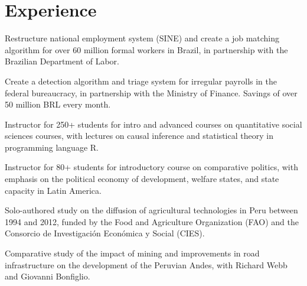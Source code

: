 \documentclass[]{deedy-resume-openfont}
\begin{document}
\hfill
%
%
\begin{minipage}[t]{0.7\textwidth} 


\section{Experience}
\vspace{\topsep} %
\begin{tightemize}
\item Restructure national employment system (SINE) and create a job matching algorithm for over 60 million formal workers in Brazil, in partnership with the Brazilian Department of Labor.
\item Create a detection algorithm and triage system for irregular payrolls in the federal bureaucracy, in partnership with the Ministry of Finance. Savings of over 50 million BRL every month.
\end{tightemize}
\sectionsep

\begin{tightemize}
\item Instructor for 250+ students for intro and advanced courses on quantitative social sciences courses, with lectures on causal inference and statistical theory in programming language R.
\item Instructor for 80+ students for introductory course on comparative politics, with emphasis on the political economy of development, welfare states, and state capacity in Latin America.
\end{tightemize}
\sectionsep


\begin{tightemize}
\item Solo-authored study on the diffusion of agricultural technologies in Peru between 1994 and 2012, funded by the Food and Agriculture Organization (FAO) and the Consorcio de Investigación Económica y Social (CIES).
\item Comparative study of the impact of mining and improvements in road infrastructure on the development of the Peruvian Andes, with Richard Webb and Giovanni Bonfiglio.
\end{tightemize}
\sectionsep


\end{minipage}
\end{document}

